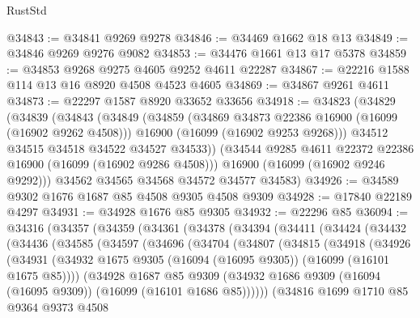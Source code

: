 \begin{lexlean}{RustStd}
\begin{coremodule}
@34843 := @34841 @9269 @9278
@34846 := @34469 @1662 @18 @13
@34849 := @34846 @9269 @9276 @9082
@34853 := @34476 @1661 @13 @17 @5378
@34859 := @34853 @9268 @9275 @4605 @9252 @4611 @22287
@34867 := @22216 @1588 @114 @13 @16 @8920 @4508 @4523 @4605
@34869 := @34867 @9261 @4611
@34873 := @22297 @1587 @8920 @33652 @33656
@34918 := @34823
    (@34829
      (@34839
        (@34843
          (@34849
            (@34859
              (@34869 @34873 @22386 @16900 (@16099 (@16902 @9262 @4508)))
              @16900
              (@16099 (@16902 @9253 @9268)))
            @34512
            @34515
            @34518
            @34522
            @34527
            @34533))
        (@34544 @9285 @4611 @22372 @22386 @16900 (@16099 (@16902 @9286 @4508)))
        @16900
        (@16099 (@16902 @9246 @9292)))
      @34562
      @34565
      @34568
      @34572
      @34577
      @34583)
@34926 := @34589 @9302 @1676 @1687 @85 @4508 @9305 @4508 @9309
@34928 := @17840 @22189 @4297
@34931 := @34928 @1676 @85 @9305
@34932 := @22296 @85
@36094 := @34316
    (@34357
      (@34359
        (@34361
          (@34378
            (@34394
              (@34411
                (@34424
                  (@34432
                    (@34436
                      (@34585
                        (@34597
                          (@34696
                            (@34704
                              (@34807
                                (@34815
                                  (@34918
                                    (@34926
                                      (@34931
                                        (@34932
                                          @1675
                                          @9305
                                          (@16094 (@16095 @9305))
                                          (@16099 (@16101 @1675 @85))))
                                      (@34928
                                        @1687
                                        @85
                                        @9309
                                        (@34932
                                          @1686
                                          @9309
                                          (@16094 (@16095 @9309))
                                          (@16099 (@16101 @1686 @85))))))
                                  (@34816
                                    @1699
                                    @1710
                                    @85
                                    @9364
                                    @9373
                                    @4508

\end{coremodule}
\end{lexlean}

